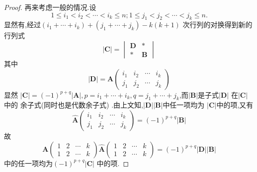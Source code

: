 {\begin{proof}
        再来考虑一般的情况.设
        \[
            1\leqslant i_1<i_2<\cdots <i_k\leqslant n;
            1\leqslant j_1<j_2<\cdots <j_k\leqslant n.
        \]
        显然有,经过$\left(
            i_1+\cdots+i_k
            \right)+\left(j_1+\cdots+j_k\right)
            -k\left(k+1\right)$
        次行列的对换得到新的行列式
        \[
            \left|\bm{C}\right|
            =
            \begin{vmatrix}
                \bm{D} & *      \\
                *      & \bm{B}
            \end{vmatrix}
        \]
        其中
        \[
            \left|\bm{D}\right|
            =\bm{A}
            \begin{pmatrix}
                i_1 & i_2 & \cdots & i_k \\
                j_1 & j_2 & \cdots & j_k
            \end{pmatrix}
        \]
        显然
        $\left|\bm{C}\right|
            =\left(-1\right)^{p+q}
            \left|\bm{A}\right|,p=
            i_1+\cdots+i_k,q=
            j_1+\cdots+j_k$,而$\left|\bm{B}
            \right|$是子式$\left|\bm{D}\right|$
        在$\left|\bm{C}\right|$中的
        余子式(同时也是代数余子式)
        .由上文知,$\left|\bm{D}\right|
            \left|\bm{B}\right|$中任一项均为
        $\left|\bm{C}\right|$中的项,又有
        \[
            \widehat{\bm{A}}
            \begin{pmatrix}
                i_1 & i_2 & \cdots & i_k \\
                j_1 & j_2 & \cdots & j_k
            \end{pmatrix}
            =
            \left(-1\right)^{p+q}\left|\bm{B}
            \right|
        \]
        故
        \[
            \bm{A}\begin{pmatrix}
                1 & 2 & \cdots & k \\
                1 & 2 & \cdots & k
            \end{pmatrix}
            \widehat{\bm{A}}
            \begin{pmatrix}
                1 & 2 & \cdots & k \\
                1 & 2 & \cdots & k
            \end{pmatrix}
            =\left(-1\right)^{p+q}
            \left|\bm{D}\right|
            \left|\bm{B}\right|
        \]
        中的任一项均为$\left(-1\right)
            ^{p+q}\left|\bm{C}\right|$
        中的项.
    \end{proof}
}
